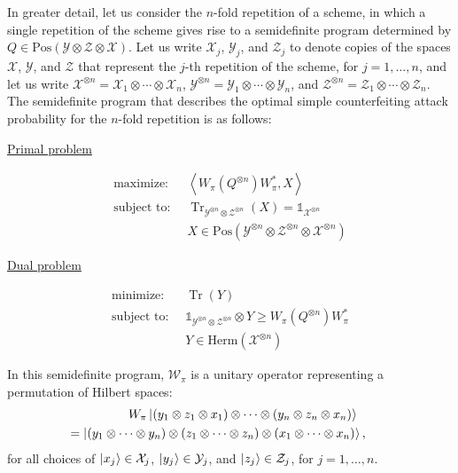 \documentclass[11pt,letterpaper]{article}
\theoremstyle{definition}
\newcommand{\microspace}{\mspace{0.5mu}}
\newcommand{\tr}{\operatorname{Tr}}
\newcommand{\ip}[2]{\left\langle #1 , #2\right\rangle}
\def\I{\mathbb{1}}
\newcommand{\setft}[1]{\mathrm{#1}}
\newcommand{\herm}[1]{\setft{Herm}\left(#1\right)}
\newcommand{\pos}[1]{\setft{Pos}\left(#1\right)}
\def \lket {\left|}
\def \rket {\right\rangle}
\newcommand{\ket}[1]{\lket\microspace #1 \microspace\rket}
\def\X{\mathcal{X}}
\def\Y{\mathcal{Y}}
\def\Z{\mathcal{Z}}
\def\W{\mathcal{W}}
\begin{document}
In greater detail, let us consider the $n$-fold repetition of a
scheme, in which a single repetition of the scheme gives rise to a
semidefinite program determined by $Q\in\pos{\Y\otimes\Z\otimes\X}$.
Let us write $\X_j$, $\Y_j$, and $\Z_j$ to denote copies of the spaces
$\X$, $\Y$, and $\Z$ that represent the $j$-th repetition of the
scheme, for $j = 1,\ldots,n$, and let us write
$\X^{\otimes n} = \X_1\otimes\cdots\otimes\X_n$,
$\Y^{\otimes n} = \Y_1\otimes\cdots\otimes\Y_n$, and
$\Z^{\otimes n} = \Z_1\otimes\cdots\otimes\Z_n$.
The semidefinite program that describes the optimal simple
counterfeiting attack probability for the $n$-fold repetition is as
follows:
\begin{center}
\begin{minipage}{0.45\textwidth}
  \centerline{\underline{Primal problem}}\vspace{-6mm}
  \begin{align*}
    \text{maximize:}\;\; & \ip{W_\pi(Q^{\otimes n}) W_\pi^{\ast}}{X}\\
    \text{subject to:}\;\; & \tr_{\Y^{\otimes n}\otimes\Z^{\otimes
        n}}(X) = \I_{\X^{\otimes n}}\\
    & X\in\pos{\Y^{\otimes n}\otimes\Z^{\otimes n}\otimes\X^{\otimes n}}
  \end{align*}
\end{minipage}\hspace*{4mm}
\begin{minipage}{0.45\textwidth}
  \centerline{\underline{Dual problem}}\vspace{-6mm}
  \begin{align*}
    \text{minimize:}\;\; & \tr(Y)\\
    \text{subject to:}\;\; & \I_{\Y^{\otimes n}\otimes\Z^{\otimes
        n}}\otimes Y \geq
    W_\pi(Q^{\otimes n}) W_\pi^{\ast}\\
    & Y \in \herm{\X^{\otimes n}}
  \end{align*}
\end{minipage}
\end{center}

\noindent
In this semidefinite program, $\W_{\pi}$ is a unitary operator
representing a permutation of Hilbert spaces:
\begin{multline*}
  \qquad
  W_{\pi}
  \ket{(y_1\otimes z_1\otimes x_1)\otimes \cdots \otimes 
    (y_n\otimes z_n\otimes x_n)} \\
  = \ket{(y_1\otimes\cdots\otimes y_n)
    \otimes
    (z_1\otimes\cdots\otimes z_n)
    \otimes
    (x_1\otimes\cdots\otimes x_n)},
  \qquad
\end{multline*}
for all choices of $\ket{x_j}\in\X_j$, $\ket{y_j}\in\Y_j$, and
$\ket{z_j}\in\Z_j$, for $j = 1,\ldots,n$.
\end{document}
